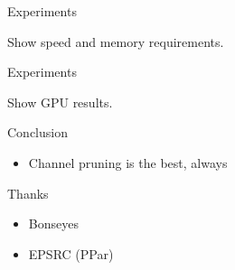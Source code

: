\documentclass{beamer}
\begin{document}
\begin{frame}{Experiments}
    
    Show speed and memory requirements.
    
\end{frame}



\begin{frame}{Experiments}
    
    Show GPU results.

    
\end{frame}








\begin{frame}{Conclusion}
    
    \begin{itemize}
        \item Channel pruning is the best, always
    \end{itemize}
    
\end{frame}


\begin{frame}{Thanks}
    \begin{itemize}
        \item Bonseyes
        \item EPSRC (PPar)
    \end{itemize}
\end{frame}
\end{document}
